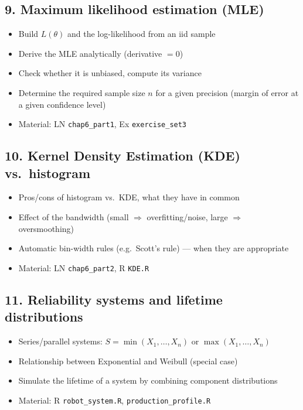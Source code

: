 \documentclass[11pt]{article}
\begin{document}
\subsection*{9. Maximum likelihood estimation (MLE)}
\begin{itemize}[leftmargin=*]
  \item Build $L(\theta)$ and the log-likelihood from an iid sample
  \item Derive the MLE analytically (derivative $=0$)
  \item Check whether it is unbiased, compute its variance
  \item Determine the required sample size $n$ for a given precision (margin of error at a
  given confidence level)
  \item Material: LN \texttt{chap6\_part1}, Ex \texttt{exercise\_set3}
\end{itemize}

\subsection*{10. Kernel Density Estimation (KDE) vs.\ histogram}
\begin{itemize}[leftmargin=*]
  \item Pros/cons of histogram vs.\ KDE, what they have in common
  \item Effect of the bandwidth (small $\Rightarrow$ overfitting/noise, large $\Rightarrow$ oversmoothing)
  \item Automatic bin-width rules (e.g.\ Scott's rule) --- when they are appropriate
  \item Material: LN \texttt{chap6\_part2}, R \texttt{KDE.R}
\end{itemize}

\subsection*{11. Reliability systems and lifetime distributions}
\begin{itemize}[leftmargin=*]
  \item Series/parallel systems: $S=\min(X_1,\dots,X_n)$ or $\max(X_1,\dots,X_n)$
  \item Relationship between Exponential and Weibull (special case)
  \item Simulate the lifetime of a system by combining component distributions
  \item Material: R \texttt{robot\_system.R}, \texttt{production\_profile.R}
\end{itemize}
\end{document}
